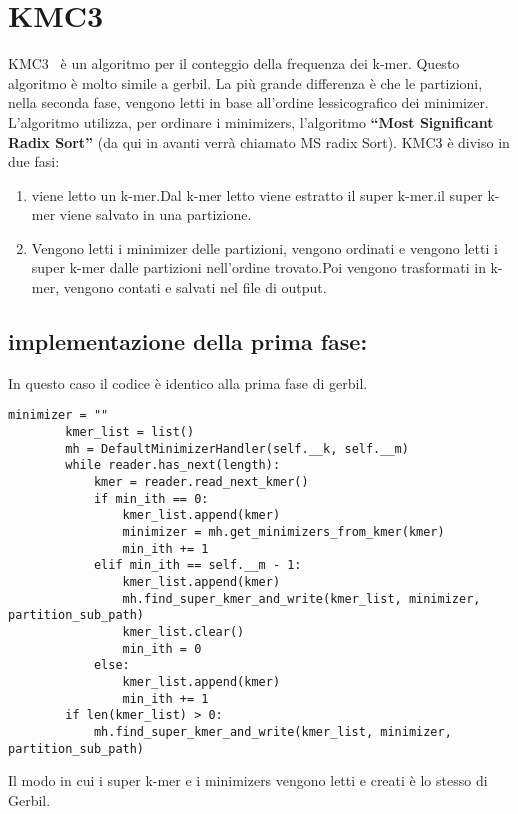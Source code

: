 
\section{KMC3}\label{sec:kmc3}
KMC3~\cite{KMC3} \`e un algoritmo per il conteggio della frequenza dei k-mer.
Questo algoritmo \`e molto simile a gerbil. La pi\`u grande differenza \`e che le partizioni, nella seconda fase, vengono letti in base all'ordine lessicografico dei minimizer.
L'algoritmo utilizza, per ordinare i minimizers, l'algoritmo \textbf{``Most Significant Radix Sort'' } (da qui in avanti verr\`a chiamato MS radix Sort).
KMC3 \`e diviso in due fasi:
\begin{enumerate}
    \item viene letto un k-mer.Dal k-mer letto viene estratto il super k-mer.il super k-mer viene salvato in una partizione.
    \item Vengono letti i minimizer delle partizioni, vengono ordinati e vengono letti i super k-mer dalle partizioni nell'ordine trovato.Poi vengono trasformati in k-mer, vengono contati e salvati nel file di output.
\end{enumerate}
\subsection{implementazione della prima fase:}\label{subsec:implementazione-della-prima-fase:}
In questo caso il codice \`e identico alla prima fase di gerbil.
\begin{lstlisting}[label={lst:prima-parte-KMC3}]
    minimizer = ""
        kmer_list = list()
        mh = DefaultMinimizerHandler(self.__k, self.__m)
        while reader.has_next(length):
            kmer = reader.read_next_kmer()
            if min_ith == 0:
                kmer_list.append(kmer)
                minimizer = mh.get_minimizers_from_kmer(kmer)
                min_ith += 1
            elif min_ith == self.__m - 1:
                kmer_list.append(kmer)
                mh.find_super_kmer_and_write(kmer_list, minimizer, partition_sub_path)
                kmer_list.clear()
                min_ith = 0
            else:
                kmer_list.append(kmer)
                min_ith += 1
        if len(kmer_list) > 0:
            mh.find_super_kmer_and_write(kmer_list, minimizer, partition_sub_path)
\end{lstlisting}
Il modo in cui i super k-mer e i minimizers vengono letti e creati \`e lo stesso di Gerbil.
